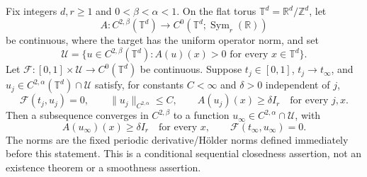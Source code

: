 Fix integers $d,r\geq1$ and $0<\beta<\alpha<1$.
On the flat torus $\mathbb T^d=\mathbb R^d/\mathbb Z^d$, let
\[
 A:C^{2,\beta}(\mathbb T^d)\longrightarrow
 C^0(\mathbb T^d;\operatorname{Sym}_r(\mathbb R))
\]
be continuous, where the target has the uniform operator norm, and set
\[
 \mathcal U=\{u\in C^{2,\beta}(\mathbb T^d):
       A(u)(x)>0\text{ for every }x\in\mathbb T^d\}.
\]
Let $\mathcal F:[0,1]\times\mathcal U\to C^0(\mathbb T^d)$ be continuous.
Suppose $t_j\in[0,1]$, $t_j\to t_\infty$, and
$u_j\in C^{2,\alpha}(\mathbb T^d)\cap\mathcal U$ satisfy, for constants
$C<\infty$ and $\delta>0$ independent of $j$,
\[
 \mathcal F(t_j,u_j)=0,\qquad
 \|u_j\|_{C^{2,\alpha}}\leq C,\qquad
 A(u_j)(x)\geq\delta I_r\quad\text{for every }j,x.
\]
Then a subsequence converges in $C^{2,\beta}$ to a function
$u_\infty\in C^{2,\alpha}\cap\mathcal U$, with
\[
 A(u_\infty)(x)\geq\delta I_r\quad\text{for every }x,
 \qquad \mathcal F(t_\infty,u_\infty)=0.
\]
The norms are the fixed periodic derivative/H\"older norms defined immediately
before this statement. This is a conditional sequential closedness assertion,
not an existence theorem or a smoothness assertion.